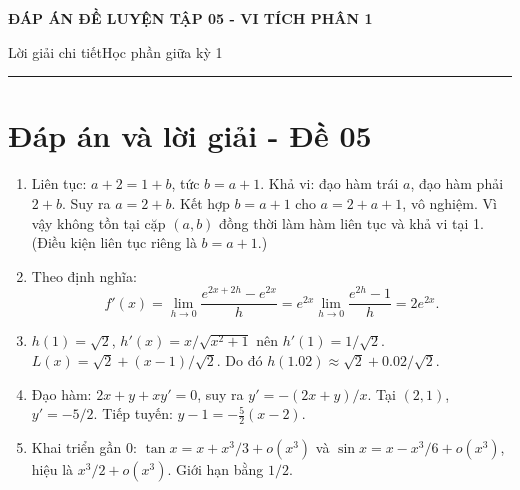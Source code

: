 \documentclass[11pt,a4paper]{article}
\newcommand{\examtitle}[4]{\begin{center}{\Large\bfseries\color{hcmusblue}#1}\par\vspace{3pt}{\large\bfseries #2}\par\vspace{3pt}\small #3\quad\textbullet\quad #4\end{center}\vspace{5pt}\hrule\vspace{8pt}}
\begin{document}
\examtitle{ĐÁP ÁN ĐỀ LUYỆN TẬP 05 - VI TÍCH PHÂN 1}{VI TÍCH PHÂN 1 - HCMUS (bộ luyện tập)}{Lời giải chi tiết}{Học phần giữa kỳ 1}

\section*{Đáp án và lời giải - Đề 05}
\begin{enumerate}
\item Liên tục: $a+2=1+b$, tức $b=a+1$. Khả vi: đạo hàm trái $a$, đạo hàm phải $2+b$. Suy ra $a=2+b$. Kết hợp $b=a+1$ cho $a=2+a+1$, vô nghiệm. Vì vậy không tồn tại cặp $(a,b)$ đồng thời làm hàm liên tục và khả vi tại 1. (Điều kiện liên tục riêng là $b=a+1$.)
\item Theo định nghĩa:
\[
f'(x)=\lim_{h\to0}\frac{e^{2x+2h}-e^{2x}}h=e^{2x}\lim_{h\to0}\frac{e^{2h}-1}{h}=2e^{2x}.
\]
\item $h(1)=\sqrt2$, $h'(x)=x/\sqrt{x^2+1}$ nên $h'(1)=1/\sqrt2$. $L(x)=\sqrt2+(x-1)/\sqrt2$. Do đó $h(1.02)\approx\sqrt2+0.02/\sqrt2$.
\item Đạo hàm: $2x+y+xy'=0$, suy ra $y'=-(2x+y)/x$. Tại $(2,1)$, $y'=-5/2$. Tiếp tuyến: $y-1=-\frac52(x-2)$.
\item Khai triển gần 0: $\tan x=x+x^3/3+o(x^3)$ và $\sin x=x-x^3/6+o(x^3)$, hiệu là $x^3/2+o(x^3)$. Giới hạn bằng $1/2$.
\end{enumerate}
\end{document}
